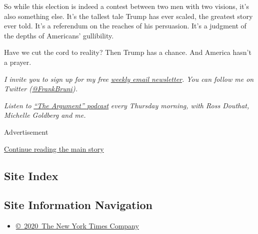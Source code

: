 So while this election is indeed a contest between two men with two
visions, it's also something else. It's the tallest tale Trump has ever
scaled, the greatest story ever told. It's a referendum on the reaches
of his persuasion. It's a judgment of the depths of Americans'
gullibility.

Have we cut the cord to reality? Then Trump has a chance. And America
hasn't a prayer.

\emph{I invite you to sign up for my free}
\href{https://www.nytimes3xbfgragh.onion/newsletters/frank-bruni}{\emph{weekly
email newsletter}}\emph{. You can follow me on Twitter
(}\href{https://twitter.com/FrankBruni}{\emph{@FrankBruni}}\emph{).}

\emph{Listen to}
\href{https://www.nytimes3xbfgragh.onion/column/the-argument}{\emph{``The
Argument'' podcast}} \emph{every Thursday morning, with Ross Douthat,
Michelle Goldberg and me.}

Advertisement

\protect\hyperlink{after-bottom}{Continue reading the main story}

\hypertarget{site-index}{%
\subsection{Site Index}\label{site-index}}

\hypertarget{site-information-navigation}{%
\subsection{Site Information
Navigation}\label{site-information-navigation}}

\begin{itemize}
\tightlist
\item
  \href{https://help.nytimes3xbfgragh.onion/hc/en-us/articles/115014792127-Copyright-notice}{©~2020~The
  New York Times Company}
\end{itemize}

